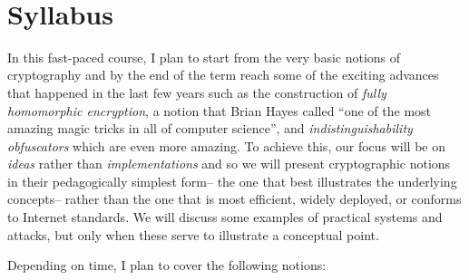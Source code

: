 ~

\section{Syllabus}\label{p-Syllabus}

In this fast-paced course, I plan to start from the very basic notions
of cryptography and by the end of the term reach some of the exciting
advances that happened in the last few years such as the construction of
\emph{fully homomorphic encryption}, a notion that Brian Hayes called
``one of the most amazing magic tricks in all of computer science'', and
\emph{indistinguishability obfuscators} which are even more amazing. To
achieve this, our focus will be on \emph{ideas} rather than
\emph{implementations} and so we will present cryptographic notions in
their pedagogically simplest form-- the one that best illustrates the
underlying concepts-- rather than the one that is most efficient, widely
deployed, or conforms to Internet standards. We will discuss some
examples of practical systems and attacks, but only when these serve to
illustrate a conceptual point.

Depending on time, I plan to cover the following notions:

